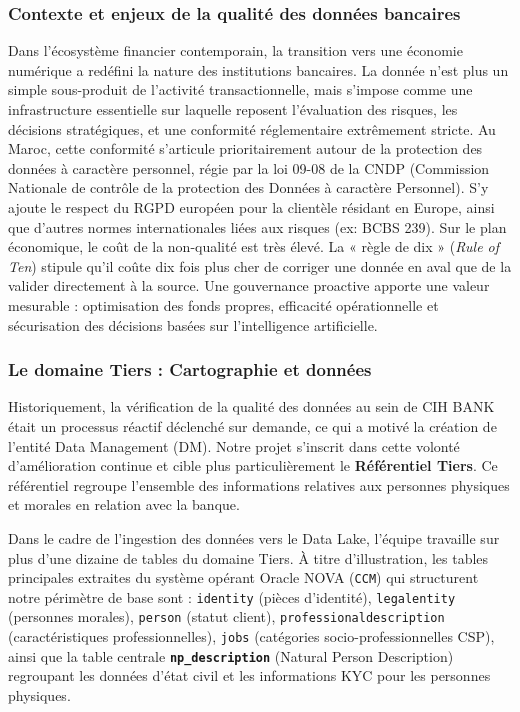 \subsubsection*{Contexte et enjeux de la qualité des données bancaires}
Dans l'écosystème financier contemporain, la transition vers une économie numérique a redéfini la nature des institutions bancaires. La donnée n'est plus un simple sous-produit de l'activité transactionnelle, mais s'impose comme une infrastructure essentielle sur laquelle reposent l'évaluation des risques, les décisions stratégiques, et une conformité réglementaire extrêmement stricte. Au Maroc, cette conformité s'articule prioritairement autour de la protection des données à caractère personnel, régie par la loi 09-08 de la CNDP (Commission Nationale de contrôle de la protection des Données à caractère Personnel). S'y ajoute le respect du RGPD européen pour la clientèle résidant en Europe, ainsi que d'autres normes internationales liées aux risques (ex: BCBS 239).
Sur le plan économique, le coût de la non-qualité est très élevé. La « règle de dix » (\textit{Rule of Ten}) stipule qu'il coûte dix fois plus cher de corriger une donnée en aval que de la valider directement à la source. Une gouvernance proactive apporte une valeur mesurable : optimisation des fonds propres, efficacité opérationnelle et sécurisation des décisions basées sur l'intelligence artificielle.

\subsubsection*{Le domaine Tiers : Cartographie et données}
Historiquement, la vérification de la qualité des données au sein de CIH BANK était un processus réactif déclenché sur demande, ce qui a motivé la création de l'entité Data Management (DM). Notre projet s'inscrit dans cette volonté d'amélioration continue et cible plus particulièrement le \textbf{Référentiel Tiers}. Ce référentiel regroupe l'ensemble des informations relatives aux personnes physiques et morales en relation avec la banque.

Dans le cadre de l'ingestion des données vers le Data Lake, l'équipe travaille sur plus d'une dizaine de tables du domaine Tiers. À titre d'illustration, les tables principales extraites du système opérant Oracle NOVA (\texttt{CCM}) qui structurent notre périmètre de base sont : \texttt{identity} (pièces d'identité), \texttt{legalentity} (personnes morales), \texttt{person} (statut client), \texttt{professionaldescription} (caractéristiques professionnelles), \texttt{jobs} (catégories socio-professionnelles CSP), ainsi que la table centrale \textbf{\texttt{np\_description}} (Natural Person Description) regroupant les données d'état civil et les informations KYC pour les personnes physiques.


